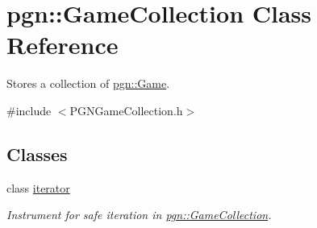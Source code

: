 \hypertarget{classpgn_1_1GameCollection}{
\section{pgn::GameCollection Class Reference}
\label{classpgn_1_1GameCollection}
}


Stores a collection of \hyperlink{classpgn_1_1Game}{pgn::Game}.  




{\ttfamily \#include $<$PGNGameCollection.h$>$}

\subsection*{Classes}
\begin{DoxyCompactItemize}
\item 
class \hyperlink{classpgn_1_1GameCollection_1_1iterator}{iterator}
\begin{DoxyCompactList}\small\item\em Instrument for safe iteration in \hyperlink{classpgn_1_1GameCollection}{pgn::GameCollection}. \item\end{DoxyCompactList}\end{DoxyCompactItemize}
